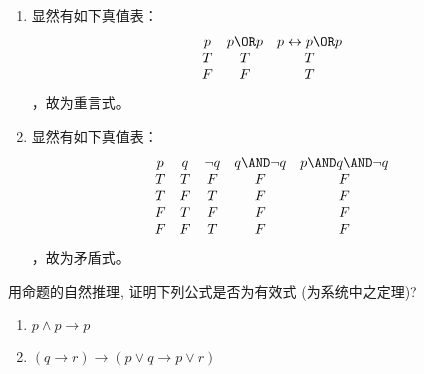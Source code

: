 \documentclass{ctexart}
\begin{document}
\begin{solution}
  \begin{enumerate}
    \item 显然有如下真值表：
      \[
        \begin{matrix}
          p & p \OR p & p \leftrightarrow p \OR p \\
          T & T       & T                         \\
          F & F       & T                         \\
        \end{matrix}
      \]，故为重言式。
    \item 显然有如下真值表：
      \[
        \begin{matrix}
          p & q & \neg q & q \AND \neg q & p \AND q \AND \neg q \\
          T & T & F      & F             & F                    \\
          T & F & T      & F             & F                    \\
          F & T & F      & F             & F                    \\
          F & F & T      & F             & F                    \\
        \end{matrix}
      \]，故为矛盾式。
  \end{enumerate}
\end{solution}
\begin{problem}\label{pro:5}
  用命题的自然推理, 证明下列公式是否为有效式 (为系统中之定理)?
  \begin{enumerate}
    \item $p \wedge p \rightarrow p$
    \item $(q \rightarrow r) \rightarrow(p \vee q \rightarrow p \vee r)$
  \end{enumerate}
\end{problem}
\end{document}
